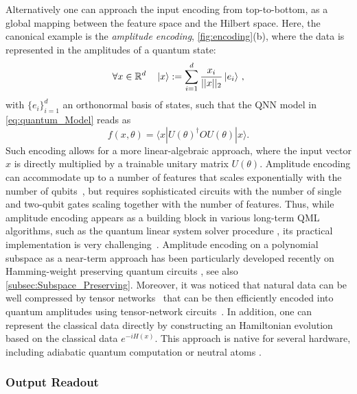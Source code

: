 \documentclass[aps,10pt,groupedaddress,prx,superscriptaddress,twocolumn,balancelastpage, tightenlines]{revtex4-2}
\theoremstyle{plain}  %
\begin{document}
Alternatively one can approach the input encoding from top-to-bottom, as a global mapping between the feature space and the Hilbert space. Here, the canonical example is the \emph{amplitude encoding}, \autoref{fig:encoding}(b), where the data is represented in the amplitudes of a quantum state:
\begin{equation}\label{eq:amplitude_encoding}
    \forall x \in \mathbb{R}^d\, \quad |x\rangle := \sum_{i=1}^d
    \frac{x_i}{||x||_2} \ket{e_i} \, ,
\end{equation}
with $\{ e_i \}_{i=1}^d$ an orthonormal basis of states, such that the QNN model in \autoref{eq:quantum_Model} reads as
 \begin{equation}
    f(x,\theta) = \langle x| U(\theta)^\dagger O U(\theta) |x\rangle. 
 \end{equation}
 Such encoding allows for a more linear-algebraic approach, where the input vector $x$ is directly multiplied by a trainable unitary matrix $U(\theta)$.
 Amplitude encoding can accommodate up to a number of features that scales exponentially with the number of qubits~\cite{long_efficient_2001, plesch_quantum-state_2011}, but requires sophisticated circuits with the number of single and two-qubit gates scaling together with the number of features. 
Thus, while amplitude encoding appears as a building block in various long-term \gls{QML} algorithms, such as the quantum linear system solver procedure \cite{harrow_quantum_2009, morales_quantum_2025}, its practical implementation is very challenging~\cite{Aaronson2015Complexity}. Amplitude encoding on a polynomial subspace as a near-term approach has been particularly developed recently on Hamming-weight preserving quantum circuits \cite{farias_quantum_2025, johri_nearest_2021, cherrat_quantum_2024,
monbroussou_trainability_2025}, see also \autoref{subsec:Subspace_Preserving}. Moreover, it was noticed that natural data can be well compressed by tensor networks~\cite{dilip2022data} that can be then efficiently encoded into quantum amplitudes using tensor-network circuits~\cite{iaconis2023tensor}. In addition, one can represent the classical data directly by constructing an Hamiltonian evolution based on the classical data $e^{-iH(x)}$. This approach is native for several hardware, including adiabatic quantum computation \cite{albash_adiabatic_2018} or neutral atoms \cite{henriet_quantum_2020}.




    
\subsubsection{Output Readout}\label{subsubsec:Output_Readout}
\end{document}
